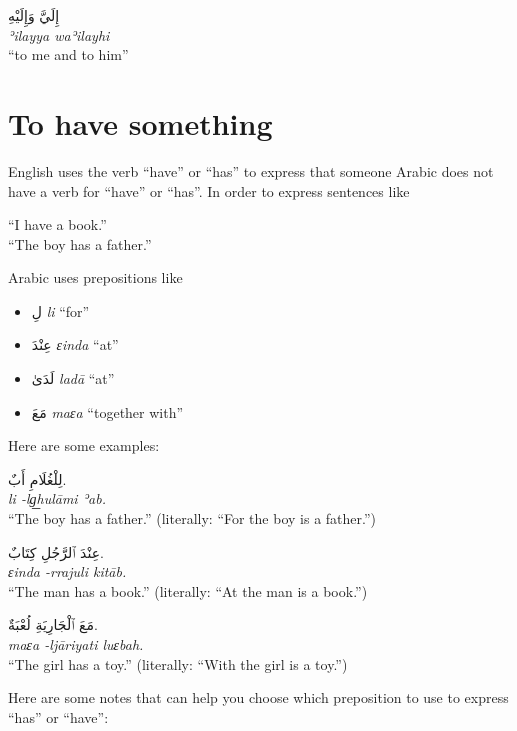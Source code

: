 \documentclass[
  10pt,
]{book}
\providecommand{\tightlist}{%
  \setlength{\itemsep}{0pt}\setlength{\parskip}{0pt}}
\begin{document}
\foreignlanguage{arabic}{إِلَيَّ وَإِلَيْهِ}\\
\emph{ʾilayya waʾilayhi}\\
\enquote{to me and to him}

\section{To have something}\label{to-have-something}

English uses the verb \enquote{have} or \enquote{has} to express that someone
Arabic does not have a verb for \enquote{have} or \enquote{has}. In order to express sentences like

\enquote{I have a book.}\\
\enquote{The boy has a father.}

Arabic uses prepositions like

\begin{itemize}
\tightlist
\item
  \foreignlanguage{arabic}{لِ} \emph{li} \enquote{for}
\item
  \foreignlanguage{arabic}{عِنْدَ} \emph{ɛinda} \enquote{at}
\item
  \foreignlanguage{arabic}{لَدَىٰ} \emph{ladā} \enquote{at}
\item
  \foreignlanguage{arabic}{مَعَ} \emph{maɛa} \enquote{together with}
\end{itemize}

Here are some examples:

\foreignlanguage{arabic}{لِلْغُلَامِ أَبٌ.}\\
\emph{li -lg͟hulāmi ʾab.}\\
\enquote{The boy has a father.} (literally: \enquote{For the boy is a father.})

\foreignlanguage{arabic}{عِنْدَ ٱلرَّجُلِ کِتَابٌ.}\\
\emph{ɛinda -rrajuli kitāb.}\\
\enquote{The man has a book.} (literally: \enquote{At the man is a book.})

\foreignlanguage{arabic}{مَعَ ٱلْجَارِيَةِ لُعْبَةٌ.}\\
\emph{maɛa -ljāriyati luɛbah.}\\
\enquote{The girl has a toy.} (literally: \enquote{With the girl is a toy.})

Here are some notes that can help you choose which preposition to use to express \enquote{has} or \enquote{have}:
\end{document}
